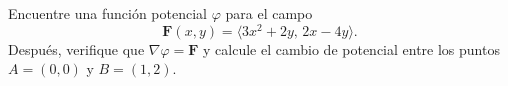 Encuentre una función potencial $\varphi$ para el campo
\[
\mathbf{F}(x,y)=\langle 3x^2+2y,\,2x-4y\rangle.
\]
Después, verifique que $\nabla\varphi=\mathbf{F}$ y calcule el cambio de potencial entre los puntos $A=(0,0)$ y $B=(1,2)$.
